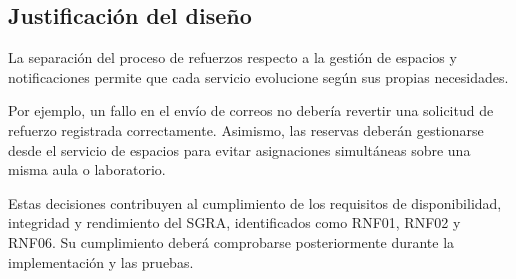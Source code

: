 \subsection{Justificación del diseño}

La separación del proceso de refuerzos respecto a la
gestión de espacios y notificaciones permite que cada
servicio evolucione según sus propias necesidades.

Por ejemplo, un fallo en el envío de correos no debería
revertir una solicitud de refuerzo registrada correctamente.
Asimismo, las reservas deberán gestionarse desde el
servicio de espacios para evitar asignaciones simultáneas
sobre una misma aula o laboratorio.

Estas decisiones contribuyen al cumplimiento de los
requisitos de disponibilidad, integridad y rendimiento
del SGRA, identificados como RNF01, RNF02 y RNF06.
Su cumplimiento deberá comprobarse posteriormente
durante la implementación y las pruebas.